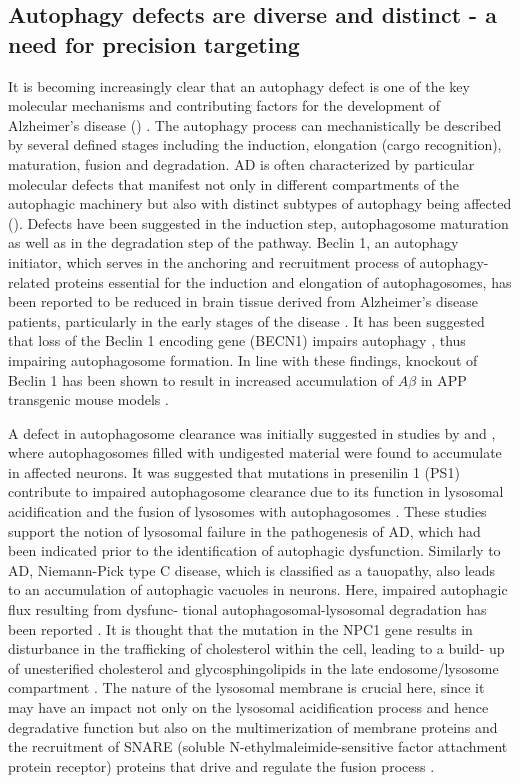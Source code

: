\subsection{Autophagy defects are diverse and distinct - a need for precision targeting}
It is becoming increasingly clear that an autophagy defect is one of the key molecular mechanisms and contributing factors for the development of Alzheimer’s disease () \citep{Nixon2005,Nixon2011}. The autophagy process can mechanistically be described by several defined stages including the induction, elongation (cargo recognition), maturation, fusion and degradation. AD is often characterized by particular molecular defects that manifest not only in different compartments of the autophagic machinery but also with distinct subtypes of autophagy being affected (). Defects have been suggested in the induction step, autophagosome maturation as well as in the degradation step of the pathway. Beclin 1, an autophagy initiator, which serves in the anchoring and recruitment process of autophagy-related proteins essential for the induction and elongation of autophagosomes, has been reported to be reduced in brain tissue derived from Alzheimer’s disease patients, particularly in the early stages of the disease \citep{Pickford2008}. It has been suggested that loss of the Beclin 1 encoding gene (BECN1) impairs autophagy \citep{Frake2015,Pickford2008}, thus impairing autophagosome formation. In line with these findings, knockout of Beclin 1 has been shown to result in increased accumulation of $A\beta$ in APP transgenic mouse models \citep{Pickford2008}.

A defect in autophagosome clearance was initially suggested in studies by \citet{Nixon2005} and \citet{Boland2008}, where autophagosomes filled with undigested material were found to accumulate in affected neurons. It was suggested that mutations in presenilin 1 (PS1) contribute to impaired autophagosome clearance due to its function in lysosomal acidification and the fusion of lysosomes with autophagosomes \citep{Lee2010,Neely2011}. These studies support the notion of lysosomal failure in the pathogenesis of AD, which had been indicated prior to the identification of autophagic dysfunction. Similarly to AD, Niemann-Pick type C disease, which is classified as a tauopathy, also leads to an accumulation of autophagic vacuoles in neurons. Here, impaired autophagic flux resulting from dysfunc- tional autophagosomal-lysosomal degradation has been reported \citep{Elrick2012,German2001,Meske2016}. It is thought that the mutation in the NPC1 gene results in disturbance in the trafficking of cholesterol within the cell, leading to a build- up of unesterified cholesterol and glycosphingolipids in the late endosome/lysosome compartment \citep{Elrick2012,Meske2016,Nixon2004}. The nature of the lysosomal membrane is crucial here, since it may have an impact not only on the lysosomal acidification process and hence degradative function but also on the multimerization of membrane proteins and the recruitment of SNARE (soluble N-ethylmaleimide-sensitive factor attachment protein receptor) proteins that drive and regulate the fusion process \citep{Itakura2012}.

